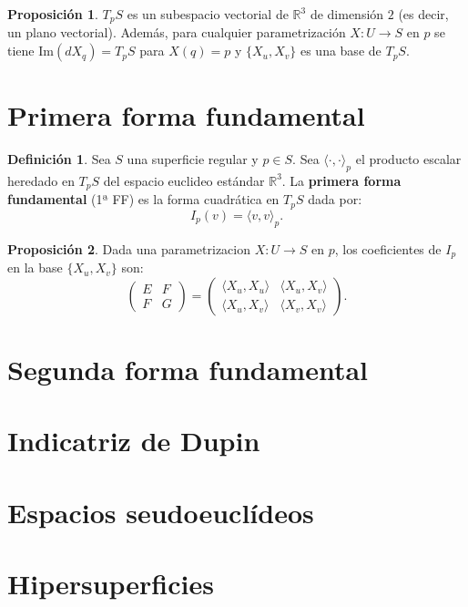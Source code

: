 \documentclass{article}
\theoremstyle{definition}
\newtheorem{prop}{Proposición}
\newtheorem{define}{Definición}
\newcommand{\reales}{\mathbb{R}}
\begin{document}
\begin{prop}
	$T_pS$ es un subespacio vectorial de $\reales^3$ de dimensión $2$ (es decir, un plano vectorial). Además, para cualquier parametrización $X: U \rightarrow S$ en $p$ se tiene $\text{Im}(dX_q) = T_pS$ para $X(q) = p$ y $\{ X_u, X_v\}$ es una base de $T_pS$.
\end{prop}



\section{Primera forma fundamental}
\begin{define}
	Sea $S$ una superficie regular y $p \in S$. Sea $\langle \cdot, \cdot \rangle_p$ el producto escalar heredado en $T_pS$ del espacio euclideo estándar $\reales^3$. La \textbf{primera forma fundamental} (1ª FF) es la forma cuadrática en $T_pS$ dada por:
	\begin{equation*}
		I_p(v) = \langle v, v\rangle_p.
	\end{equation*}
\end{define}

\begin{prop}
	Dada una parametrizacion $X: U \rightarrow S$ en $p$, los coeficientes de $I_p$ en la base $\{ X_u, X_v\}$ son:
	\begin{equation*}
		\left(
		\begin{array}{cc}
			E & F \\ 
			F & G
		\end{array}
		\right) = 
		\left(
		\begin{array}{cc}
			\langle X_u, X_u \rangle & \langle X_u, X_v \rangle \\ 
			\langle X_u, X_v \rangle & \langle X_v, X_v \rangle
		\end{array}
		\right).
	\end{equation*}
\end{prop}

\section{Segunda forma fundamental}
\section{Indicatriz de Dupin}

\section{Espacios seudoeuclídeos}
\section{Hipersuperficies}
\end{document}

